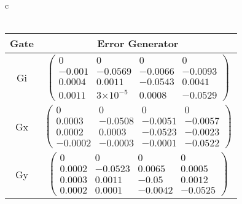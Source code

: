 \documentclass{beamer}
\providecommand{\e}[1]{\ensuremath{\times 10^{#1}}}
\begin{document}
\begin{frame}
\begin{table}[h]
\begin{center}
{\begin{tabular}{c}
\\
\vspace{2em}
\\
\begin{tabular}[l]{|c|c|}
\hline
Gate & Error Generator \\ \hline
Gi & $ \left(\!\!\begin{array}{cccc}
0 & 0 & 0 & 0 \\ 
-0.001 & -0.0569 & -0.0066 & -0.0093 \\ 
0.0004 & 0.0011 & -0.0543 & 0.0041 \\ 
0.0011 & 3\e{-5} & 0.0008 & -0.0529
 \end{array}\!\!\right) $
 \\ \hline
Gx & $ \left(\!\!\begin{array}{cccc}
0 & 0 & 0 & 0 \\ 
0.0003 & -0.0508 & -0.0051 & -0.0057 \\ 
0.0002 & 0.0003 & -0.0523 & -0.0023 \\ 
-0.0002 & -0.0003 & -0.0001 & -0.0522
 \end{array}\!\!\right) $
 \\ \hline
Gy & $ \left(\!\!\begin{array}{cccc}
0 & 0 & 0 & 0 \\ 
0.0002 & -0.0523 & 0.0065 & 0.0005 \\ 
0.0003 & 0.0011 & -0.05 & 0.0012 \\ 
0.0002 & 0.0001 & -0.0042 & -0.0525
 \end{array}\!\!\right) $
 \\ \hline
\end{tabular}

\end{tabular}
}
\end{center}
\end{table}

\end{frame}
\end{document}
